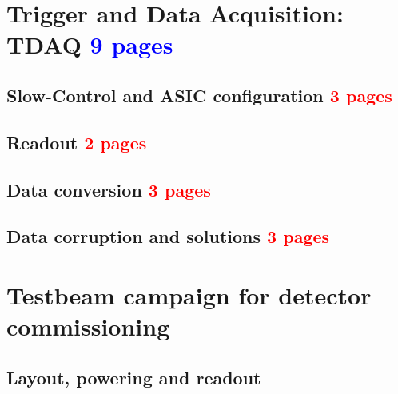 	\section{Trigger and Data Acquisition: TDAQ \textcolor{blue}{ 9 pages}}
		\subsection{Slow-Control and ASIC configuration \textcolor{red}{ 3 pages}}
		\subsection{Readout \textcolor{red}{ 2 pages}}
		\subsection{Data conversion \textcolor{red}{ 3 pages}}
		\subsection{Data corruption and solutions  \textcolor{red}{ 3 pages}}

	\section{Testbeam campaign for detector commissioning}
		\subsection{Layout, powering and readout}
		\subsection{}